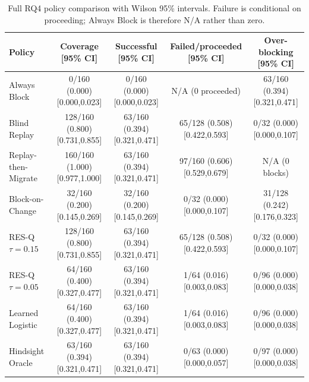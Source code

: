 \begin{table}[t]
\centering
\scriptsize
\begin{tabular}{@{}lcccc@{}}
\toprule
Policy & Coverage [95\% CI] & Successful [95\% CI] & Failed/proceeded [95\% CI] & Over-blocking [95\% CI] \\
\midrule
Always Block & 0/160 (0.000) [0.000,0.023] & 0/160 (0.000) [0.000,0.023] & N/A (0 proceeded) & 63/160 (0.394) [0.321,0.471] \\
Blind Replay & 128/160 (0.800) [0.731,0.855] & 63/160 (0.394) [0.321,0.471] & 65/128 (0.508) [0.422,0.593] & 0/32 (0.000) [0.000,0.107] \\
Replay-then-Migrate & 160/160 (1.000) [0.977,1.000] & 63/160 (0.394) [0.321,0.471] & 97/160 (0.606) [0.529,0.679] & N/A (0 blocks) \\
Block-on-Change & 32/160 (0.200) [0.145,0.269] & 32/160 (0.200) [0.145,0.269] & 0/32 (0.000) [0.000,0.107] & 31/128 (0.242) [0.176,0.323] \\
RES-Q $\tau=0.15$ & 128/160 (0.800) [0.731,0.855] & 63/160 (0.394) [0.321,0.471] & 65/128 (0.508) [0.422,0.593] & 0/32 (0.000) [0.000,0.107] \\
RES-Q $\tau=0.05$ & 64/160 (0.400) [0.327,0.477] & 63/160 (0.394) [0.321,0.471] & 1/64 (0.016) [0.003,0.083] & 0/96 (0.000) [0.000,0.038] \\
Learned Logistic & 64/160 (0.400) [0.327,0.477] & 63/160 (0.394) [0.321,0.471] & 1/64 (0.016) [0.003,0.083] & 0/96 (0.000) [0.000,0.038] \\
Hindsight Oracle & 63/160 (0.394) [0.321,0.471] & 63/160 (0.394) [0.321,0.471] & 0/63 (0.000) [0.000,0.057] & 0/97 (0.000) [0.000,0.038] \\
\bottomrule
\end{tabular}
\caption{Full RQ4 policy comparison with Wilson 95\% intervals. Failure is conditional on proceeding; Always Block is therefore N/A rather than zero.}
\label{tab:rq4-policy-comparison-full}
\end{table}
